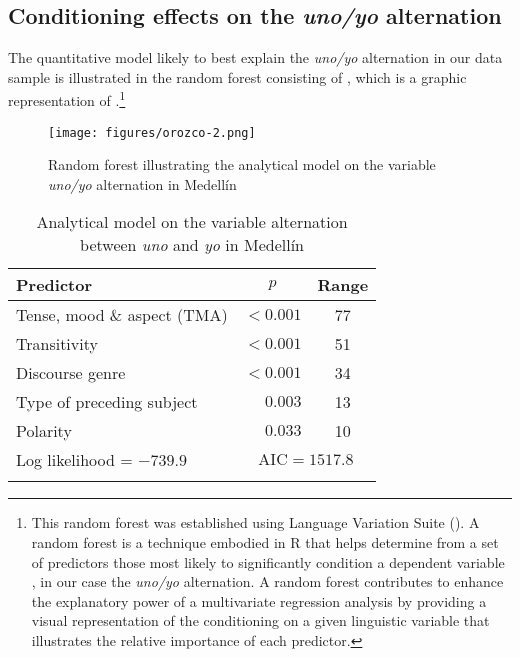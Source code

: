 \documentclass[output=paper]{langscibook}
\begin{document}
\subsection{Conditioning effects on the \textit{uno/yo} alternation}\label{sec:orozco:4.2}


The quantitative model likely to best explain the \textit{uno/yo} alternation in our data sample is illustrated in the random forest consisting of , which is a graphic representation of .\footnote{This random forest was established using Language Variation Suite (\citealt{ScrivnerDíaz-Campos2016}). A random forest is a technique embodied in R that helps determine from a set of predictors those most likely to significantly condition a dependent variable \citep[152]{Tagliamonte2012}, in our case the \textit{uno/yo} alternation. A random forest contributes to enhance the explanatory power of a multivariate regression analysis by providing a visual representation of the conditioning on a given linguistic variable that illustrates the relative importance of each predictor.}   


\begin{figure}
\texttt{[image: figures/orozco-2.png]}
\caption{\label{fig:orozco:2}Random forest illustrating the analytical model on the variable \textit{uno/yo} alternation in Medellín}
\end{figure}

\begin{table}
\begin{tabular}{lrc}
\lsptoprule
Predictor & \multicolumn{1}{c}{$p$} & { Range}\\
\midrule
Tense, mood \& aspect (TMA) &  $<0.001$ &  77\\
Transitivity &  $<0.001$ &  51\\
Discourse genre  &  $<0.001$ &  34\\
Type of preceding subject  &  $0.003$ &  13\\
Polarity  &  $0.033$ &  10\\
Log likelihood = $-739.9$ & \multicolumn{2}{c}{$\text{AIC}=1517.8$}\\
\lspbottomrule
\end{tabular}
\caption{Analytical model on the variable alternation between \textit{uno} and \textit{yo} in Medellín}
\label{tab:orozco:3}
\end{table}
\end{document}
